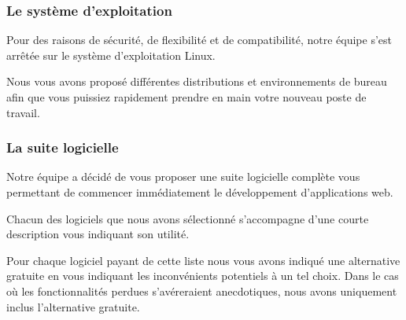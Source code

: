 \subsubsection{Le système d'exploitation}

Pour des raisons de sécurité, de flexibilité et de compatibilité, notre équipe s’est arrêtée sur le système d’exploitation Linux. 

Nous vous avons proposé différentes distributions et environnements de bureau afin que vous puissiez rapidement prendre en main votre nouveau poste de travail.

\subsubsection{La suite logicielle}

Notre équipe a décidé de vous proposer une suite logicielle complète vous permettant de commencer immédiatement le développement d’applications web.

Chacun des logiciels que nous avons sélectionné s’accompagne d’une courte description vous indiquant son utilité.

Pour chaque logiciel payant de cette liste nous vous avons indiqué une alternative gratuite en vous indiquant les inconvénients potentiels à un tel choix. Dans le cas où les fonctionnalités perdues s'avéreraient anecdotiques, nous avons uniquement inclus l’alternative gratuite.
